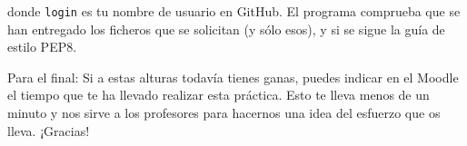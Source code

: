 \documentclass[11pt,a4paper]{article}
\begin{document}
donde \texttt{login} es tu nombre de usuario en GitHub. El programa comprueba que se han entregado los ficheros que se solicitan (y sólo esos), y si se sigue la guía de estilo PEP8. 

\vspace{1cm}

\footnotesize{Para el final: Si a estas alturas todavía tienes ganas, puedes indicar en el Moodle el tiempo que te ha llevado realizar esta práctica. Esto te lleva menos de un minuto y nos sirve a los profesores para hacernos una idea del esfuerzo que os lleva. ¡Gracias!}
\end{document}
